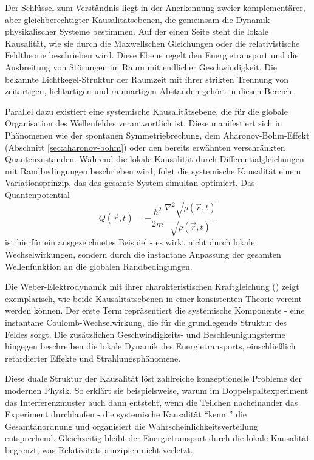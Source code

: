 Der Schlüssel zum Verständnis liegt in der Anerkennung zweier komplementärer, aber gleichberechtigter Kausalitätsebenen, die gemeinsam die Dynamik physikalischer Systeme bestimmen.
Auf der einen Seite steht die lokale Kausalität, wie sie durch die Maxwellschen Gleichungen oder die relativistische Feldtheorie beschrieben wird. Diese Ebene regelt den Energietransport
und die Ausbreitung von Störungen im Raum mit endlicher Geschwindigkeit. Die bekannte Lichtkegel-Struktur der Raumzeit mit ihrer strikten Trennung von zeitartigen, lichtartigen und
raumartigen Abständen gehört in diesen Bereich.

Parallel dazu existiert eine systemische Kausalitätsebene, die für die globale Organisation des Wellenfeldes verantwortlich ist. Diese manifestiert sich in Phänomenen wie der
spontanen Symmetriebrechung, dem Aharonov-Bohm-Effekt (Abschnitt \ref{sec:aharonov-bohm}) oder den bereits erwähnten verschränkten Quantenzuständen. Während die lokale Kausalität durch Differentialgleichungen mit
Randbedingungen beschrieben wird, folgt die systemische Kausalität einem Variationsprinzip, das das gesamte System simultan optimiert.
Das Quantenpotential \cite{bohm1952}
\begin{equation}
    \label{eq:bohm_potenzial}
    Q(\vec{r},t) = -\frac{\hbar^2}{2m} \frac{\nabla^2 \sqrt{\rho(\vec{r},t)}}{\sqrt{\rho(\vec{r},t)}}
\end{equation}
ist hierfür ein ausgezeichnetes Beispiel - es wirkt nicht durch lokale Wechselwirkungen, sondern durch die instantane Anpassung der gesamten
Wellenfunktion an die globalen Randbedingungen.

Die Weber-Elektrodynamik mit ihrer charakteristischen Kraftgleichung () zeigt exemplarisch, wie beide Kausalitätsebenen in einer konsistenten Theorie vereint werden können.
Der erste Term repräsentiert die systemische Komponente - eine instantane Coulomb-Wechselwirkung, die für die grundlegende Struktur des Feldes sorgt. Die zusätzlichen Geschwindigkeits- und
Beschleunigungsterme hingegen beschreiben die lokale Dynamik des Energietransports, einschließlich retardierter Effekte und Strahlungsphänomene.

Diese duale Struktur der Kausalität löst zahlreiche konzeptionelle Probleme der modernen Physik. So erklärt sie beispielsweise, warum im Doppelspaltexperiment das Interferenzmuster
auch dann entsteht, wenn die Teilchen nacheinander das Experiment durchlaufen - die systemische Kausalität \enquote{kennt} die Gesamtanordnung und organisiert die Wahrscheinlichkeitsverteilung
entsprechend. Gleichzeitig bleibt der Energietransport durch die lokale Kausalität begrenzt, was Relativitätsprinzipien nicht verletzt.

